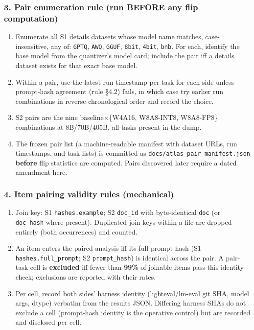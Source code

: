 \subsubsection{3. Pair enumeration rule (run BEFORE any flip computation)}
\begin{enumerate}
\item Enumerate all S1 details datasets whose model name matches, case-insensitive, any of: \texttt{GPTQ}, \texttt{AWQ}, \texttt{GGUF}, \texttt{8bit}, \texttt{4bit}, \texttt{bnb}. For each, identify the base model from the quantizer's model card; include the pair iff a details dataset exists for that exact base model.
\item Within a pair, use the latest run timestamp per task for each side unless prompt-hash agreement (rule \S{}4.2) fails, in which case try earlier run combinations in reverse-chronological order and record the choice.
\item S2 pairs are the nine baseline$\times$\{W4A16, W8A8-INT8, W8A8-FP8\} combinations at 8B/70B/405B, all tasks present in the dump.
\item The frozen pair list (a machine-readable manifest with dataset URLs, run timestamps, and task lists) is committed as \texttt{docs/\allowbreak{}atlas\_pair\_manifest.json} \textbf{before} flip statistics are computed. Pairs discovered later require a dated amendment here.
\end{enumerate}
\subsubsection{4. Item pairing validity rules (mechanical)}
\begin{enumerate}
\item Join key: S1 \texttt{hashes.example}; S2 \texttt{doc\_id} with byte-identical \texttt{doc} (or \texttt{doc\_hash} where present). Duplicated join keys within a file are dropped entirely (both occurrences) and counted.
\item An item enters the paired analysis iff its full-prompt hash (S1 \texttt{hashes.full\_prompt}; S2 \texttt{prompt\_hash}) is identical across the pair. A pair-task cell is \textbf{excluded} iff fewer than \textbf{99\%} of joinable items pass this identity check; exclusions are reported with their rates.
\item Per cell, record both sides' harness identity (lighteval/lm-eval git SHA, model args, dtype) verbatim from the results JSON. Differing harness SHAs do not exclude a cell (prompt-hash identity is the operative control) but are recorded and disclosed per cell.
\end{enumerate}
